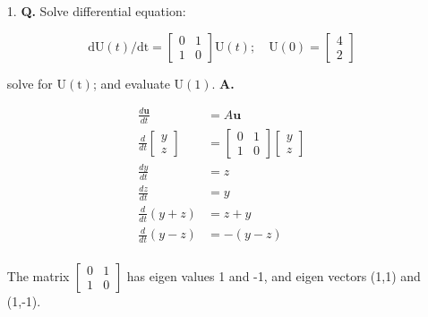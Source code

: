 \documentclass[main.tex]{subfiles}
\begin{document}
\begin{enumerate}
\item [1.] \textbf{Q.} Solve differential equation:

$$
\mathrm{dU}(t) / \mathrm{dt}=\left[\begin{array}{ll}
0 & 1 \\
1 & 0
\end{array}\right] \mathrm{U}(t) ; \quad \mathrm{U}(0)=\left[\begin{array}{l}
4 \\
2
\end{array}\right]
$$

solve for $\mathrm{U}(\mathrm{t})$; and evaluate $\mathrm{U}(1)$. \textbf{A.}

$$
\begin{aligned}
\frac{d\bm{u}}{dt} & = A\bm{u}\\
\frac{d}{dt} \left[\begin{array}{l}
y \\
z 
\end{array}\right] & = \left[\begin{array}{ll}
0 & 1\\
1 & 0
\end{array}\right] \left[\begin{array}{l}
y \\
z 
\end{array}\right]\\
\frac{dy}{dt} &= z\\
\frac{dz}{dt} &= y\\
\frac{d}{dt}(y+z) &= z+y\\
\frac{d}{dt}(y-z) &= -(y-z)\\
\end{aligned}
$$

The matrix $\left[\begin{array}{ll} 0 & 1 \\ 1 & 0 \end{array}\right]$ has eigen values 1 and -1, and eigen vectors (1,1) and (1,-1).


\end{enumerate}
\end{document}
